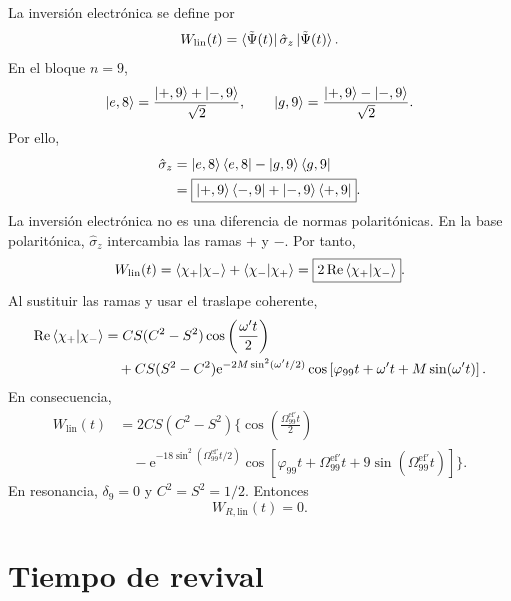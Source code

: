 \documentclass[11pt]{article}
\newcommand{\ee}{\mathrm{e}}
\begin{document}
La inversi\'on electr\'onica se define por
\begin{equation}
  W_{\mathrm{lin}}(t)
  =
  \bra{\tilde\Psi(t)}\hat\sigma_z\ket{\tilde\Psi(t)}.
\end{equation}
En el bloque $n=9$,
\begin{equation}
  \ket{e,8}
  =
  \frac{\ket{+,9}+\ket{-,9}}{\sqrt2},
  \qquad
  \ket{g,9}
  =
  \frac{\ket{+,9}-\ket{-,9}}{\sqrt2}.
\end{equation}
Por ello,
\begin{align}
  \hat\sigma_z
  &=
  \ket{e,8}\bra{e,8}
  -
  \ket{g,9}\bra{g,9}
  \notag\\
  &=
  \boxed{
  \ket{+,9}\bra{-,9}
  +
  \ket{-,9}\bra{+,9}
  }.
\end{align}
La inversi\'on electr\'onica no es una diferencia de normas polarit\'onicas.
En la base polarit\'onica, $\hat\sigma_z$ intercambia las ramas $+$ y $-$.
Por tanto,
\begin{equation}
  W_{\mathrm{lin}}(t)
  =
  \braket{\chi_+|\chi_-}
  +
  \braket{\chi_-|\chi_+}
  =
  \boxed{2\operatorname{Re}\braket{\chi_+|\chi_-}}.
\end{equation}
Al sustituir las ramas y usar el traslape coherente,
\begin{align}
  \operatorname{Re}\braket{\chi_+|\chi_-}
  &=
  CS(C^2-S^2)\cos\left(\frac{\omega't}{2}\right)
  \notag\\
  &\quad+
  CS(S^2-C^2)\ee^{-2M\sin^2(\omega't/2)}
  \cos\left[
  \varphi_{99}t+\omega't+M\sin(\omega't)
  \right].
\end{align}
En consecuencia,
\begin{equation}
  \boxed{
  \begin{aligned}
  W_{\mathrm{lin}}(t)
  &=
  2CS(C^2-S^2)
  \Bigg\{
  \cos\left(
  \frac{\Omega_{99}^{\mathrm{ef}\prime}t}{2}
  \right)
  \\
  &\quad-
  \ee^{-18\sin^2(\Omega_{99}^{\mathrm{ef}\prime}t/2)}
  \cos\left[
  \varphi_{99}t
  +\Omega_{99}^{\mathrm{ef}\prime}t
  +9\sin(\Omega_{99}^{\mathrm{ef}\prime}t)
  \right]
  \Bigg\}.
  \end{aligned}
  }
\end{equation}
En resonancia, $\delta_9=0$ y $C^2=S^2=1/2$. Entonces
\begin{equation}
  \boxed{
  W_{R,\mathrm{lin}}(t)=0.
  }
\end{equation}

\section{Tiempo de revival}
\end{document}

